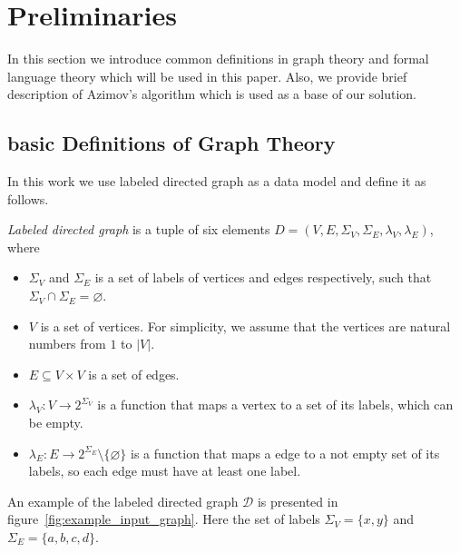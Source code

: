 \section{Preliminaries}

In this section we introduce common definitions in graph theory and formal language theory which will be used in this paper. 
Also, we provide brief description of Azimov's algorithm which is used as a base of our solution.

\subsection{basic Definitions of Graph Theory}

In this work we use labeled directed graph as a data model and define it as follows.
\begin{definition} \emph{Labeled directed graph} is a tuple of six elements $D = (V, E, \Sigma_V, \Sigma_E, \lambda_V, \lambda_E)$, where
\begin{itemize}
    \item $\Sigma_V$ and $\Sigma_E$ is a set of labels of vertices and edges respectively, such that $\Sigma_V \cap \Sigma_E = \varnothing$.
    \item $V$ is a set of vertices. For simplicity, we assume that the vertices are natural numbers from $1$ to $|V|$.
    \item $E \subseteq V \times V$ is a set of edges.
    \item $\lambda_V : V \xrightarrow{} 2^{\Sigma_V}$ is a function that maps a vertex to a set of its labels, which can be empty.
    \item $\lambda_E : E \xrightarrow{} 2^{\Sigma_E} \setminus \{\varnothing\}$ is a function that maps a edge to a not empty set of its labels, so each edge must have at least one label.
\end{itemize}
\end{definition}

An example of the labeled directed graph $\mathcal{D}$ is presented in figure~\ref{fig:example_input_graph}. Here the set of labels $\Sigma_V = \{x, y\}$ and $\Sigma_E = \{a, b, c, d\}$.

